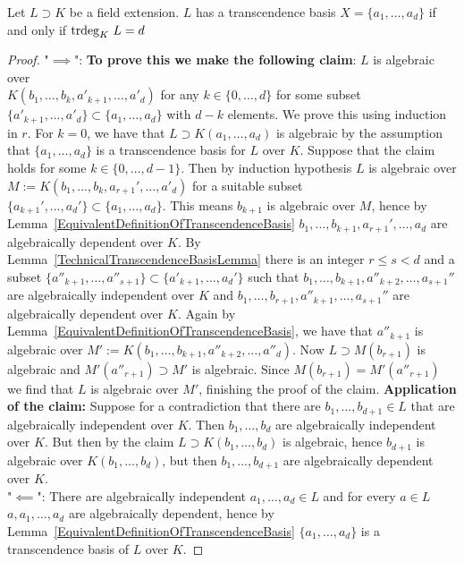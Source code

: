 \begin{theorem}\label{CardinalityOfTranscendenceBasisIsEqualToTranscendenceDegree}
    Let $L\supset K$ be a field extension. $L$ has a transcendence basis $X=\{a_1,\dots, a_d\}$ if and only if $\mathrm{trdeg }_K \ L = d$
\end{theorem}
\begin{proof}
    "$\implies$": 
    \textbf{To prove this we make the following claim}: $L$ is algebraic over\\ $K(b_1,\dots,b_{k}, a'_{k+1},\dots,a'_{d})$ for any $k\in \{0,\dots,d\}$ for some subset $\{a'_{k+1},\dots,a'_{d}\}\subset \{a_1,\dots,a_d\}$ with $d-k$ elements.  We prove this using induction in $r$. For $k=0$, we have that $L\supset K(a_1,\dots,a_d)$ is algebraic by the assumption that $\{a_1,\dots,a_d\}$ is a transcendence basis for $L$ over $K$. Suppose that the claim holds for some $k\in\{0,\dots,d-1\}$. Then by induction hypothesis $L$ is algebraic over $M := K(b_1,\dots,b_k,a_{r+1}',\dots,a'_d)$ for a suitable subset $\{a_{k+1}',\dots,a_{d}'\}\subset \{a_1,\dots,a_d\}$. This means $b_{k+1}$ is algebraic over $M$, hence by Lemma~\ref{EquivalentDefinitionOfTranscendenceBasis} $b_1,\dots,b_{k+1},a_{r+1}',\dots,a_d$ are algebraically dependent over $K$. By Lemma~\ref{TechnicalTranscendenceBasisLemma} there is an integer $r\leq s<d$ and a subset $\{a''_{k+1},\dots,a''_{s+1}\}\subset \{a'_{k+1},\dots,a_{d}'\}$ such that $b_1,\dots,b_{k+1},a''_{k+2},\dots,a_{s+1}''$ are algebraically independent over $K$ and $b_1,\dots,b_{r+1},a''_{k+1},\dots,a_{s+1}''$ are algebraically dependent over $K$. Again by Lemma~\ref{EquivalentDefinitionOfTranscendenceBasis}, we have that $a''_{k+1}$ is algebraic over $M':= K(b_1,\dots,b_{k+1},a''_{k+2},\dots,a''_d)$. Now $L\supset M(b_{r+1})$ is algebraic and $M'(a''_{r+1})\supset M'$ is algebraic. Since $M(b_{r+1})=M'(a''_{r+1})$ we find that $L$ is algebraic over $M'$, finishing the proof of the claim.
    \textbf{Application of the claim:} Suppose for a contradiction that there are $b_1,\dots,b_{d+1}\in L$ that are algebraically independent over $K$. Then $b_1,\dots,b_d$ are algebraically independent over $K$. But then by the claim $L\supset K(b_1,\dots,b_d)$ is algebraic, hence $b_{d+1}$ is algebraic over $K(b_1,\dots,b_d)$, but then $b_1,\dots,b_{d+1}$ are algebraically dependent over $K$.\\ 
    "$\impliedby$": There are algebraically independent $a_1,\dots,a_d \in L$ and for every $a\in L$ $a,a_1,\dots,a_d$ are algebraically dependent, hence by Lemma~\ref{EquivalentDefinitionOfTranscendenceBasis} $\{a_1,\dots,a_d\}$ is a transcendence basis of $L$ over $K$.
\end{proof}
